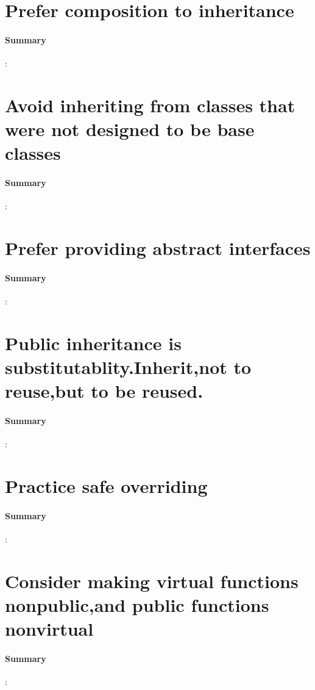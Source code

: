 \documentclass[UTF8,a4paper,12pt]{ctexbook}
\begin{document}
		
	\section{Prefer composition to inheritance}
		\paragraph{Summary}:
		
		
	\section{Avoid inheriting from classes that were not designed to be base classes}
		\paragraph{Summary}:
		
		
	\section{Prefer providing abstract interfaces}
		\paragraph{Summary}:
		
		
	\section{Public inheritance is substitutablity.Inherit,not to reuse,but to be reused.}
		\paragraph{Summary}:
		
		
	\section{Practice safe overriding}
		\paragraph{Summary}:
		
		
	\section{Consider making virtual functions nonpublic,and public functions nonvirtual}
		\paragraph{Summary}:
		
\end{document}
